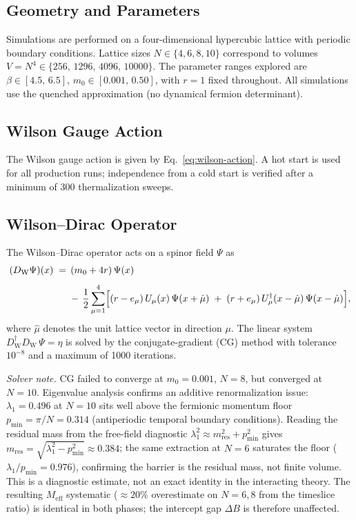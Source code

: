 \documentclass[12pt]{article}
\newcommand{\dW}{D_{\mathrm{W}}}       %
\begin{document}
\subsection{Geometry and Parameters}
\label{sec:geometry}

Simulations are performed on a four-dimensional hypercubic lattice with
periodic boundary conditions.  Lattice sizes $N\in\{4,6,8,10\}$
correspond to volumes $V = N^4 \in \{256,\,1296,\,4096,\,10000\}$.
The parameter ranges explored are $\beta\in[4.5,\,6.5]$,
$m_0\in[0.001,\,0.50]$, with $r=1$ fixed throughout.  All simulations
use the quenched approximation (no dynamical fermion determinant).

\subsection{Wilson Gauge Action}
\label{sec:wilson-gauge}

The Wilson gauge action is given by Eq.~\eqref{eq:wilson-action}.
A hot start is used for all production runs; independence from a cold
start is verified after a minimum of 300 thermalization sweeps.

\subsection{Wilson--Dirac Operator}
\label{sec:wilson-dirac}

The Wilson--Dirac operator acts on a spinor field $\Psi$ as
\begin{equation}
\begin{split}
  (\dW\Psi)(x) \;=\; &\,(m_0+4r)\,\Psi(x) \\[4pt]
  &-\,\frac{1}{2}\sum_{\mu=1}^{4}
    \Bigl[
      (r-e_\mu)\,U_\mu(x)\,\Psi(x+\hat{\mu})
      \;+\;
      (r+e_\mu)\,U_\mu^\dagger(x-\hat{\mu})\,\Psi(x-\hat{\mu})
    \Bigr],
\end{split}
\label{eq:wilson-dirac}
\end{equation}
where $\hat{\mu}$ denotes the unit lattice vector in direction $\mu$.
The linear system $\dW^\dagger\dW\,\Psi = \eta$ is solved by the
conjugate-gradient (CG) method with tolerance $10^{-8}$ and a maximum
of 1000 iterations.

\smallskip
\noindent\textit{Solver note.}\enspace
CG failed to converge at $m_0=0.001$, $N=8$, but converged at $N=10$.
Eigenvalue analysis confirms an additive renormalization issue:
$\lambda_1=0.496$ at $N=10$ sits well above the fermionic momentum
floor $p_{\mathrm{min}}=\pi/N=0.314$ (antiperiodic temporal boundary
conditions).  Reading the residual mass from the free-field diagnostic
$\lambda_1^2\approx m_{\mathrm{res}}^2+p_{\mathrm{min}}^2$ gives
$m_{\mathrm{res}}=\sqrt{\lambda_1^2-p_{\mathrm{min}}^2}\approx0.384$;
the same extraction at $N=6$ saturates the floor
($\lambda_1/p_{\mathrm{min}}=0.976$), confirming the barrier is the
residual mass, not finite volume.  This is a diagnostic estimate, not
an exact identity in the interacting theory.  The resulting $M_{\mathrm{eff}}$ systematic
(${\approx}20\%$ overestimate on $N=6,8$ from the timeslice ratio) is
identical in both phases; the intercept gap $\Delta B$ is therefore
unaffected.
\end{document}
